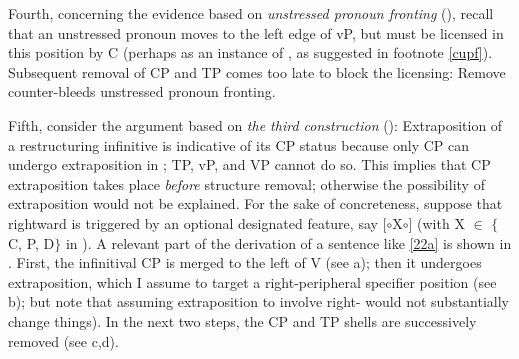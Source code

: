\documentclass[output=paper]{langsci/langscibook}
\begin{document}
Fourth, concerning the evidence based on {\itshape unstressed pronoun
fronting}
(), recall that  an unstressed pronoun moves to the left edge of vP,
but must be licensed in this position by C (perhaps as an instance of , as
suggested in footnote \ref{cupf}). Subsequent removal of CP and TP comes too
late to block the licensing: Remove counter-bleeds unstressed pronoun fronting.

Fifth, consider the argument based on {\itshape the third construction} ():
Extraposition of a restructuring infinitive is indicative of its CP status
because only CP can undergo extraposition in ; TP, vP, and VP cannot do
so. This implies that CP extraposition takes place {\itshape before} structure
removal; otherwise the possibility of extraposition would not be explained. For
the sake of concreteness, suppose that rightward  is triggered by an
optional designated feature, say [$\circ$X$\circ$] (with X $\in$ $\{$C, P,
D$\}$ in ). A relevant part of the derivation of a sentence like
\eqref{22a} is shown in . First, the infinitival CP is merged
to the left of V (see a); then it undergoes extraposition,
which I assume to target a right-peripheral specifier position (see
b); but note that assuming extraposition to involve
right- would not substantially change things). In the next two steps,
the CP and TP shells are successively removed (see c,d).
\end{document}
